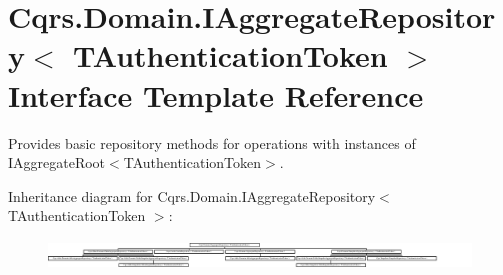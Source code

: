 \hypertarget{interfaceCqrs_1_1Domain_1_1IAggregateRepository}{}\section{Cqrs.\+Domain.\+I\+Aggregate\+Repository$<$ T\+Authentication\+Token $>$ Interface Template Reference}
\label{interfaceCqrs_1_1Domain_1_1IAggregateRepository}


Provides basic repository methods for operations with instances of I\+Aggregate\+Root$<$\+T\+Authentication\+Token$>$.  


Inheritance diagram for Cqrs.\+Domain.\+I\+Aggregate\+Repository$<$ T\+Authentication\+Token $>$\+:\begin{figure}[H]
\begin{center}
\leavevmode
\includegraphics[height=0.785965cm]{interfaceCqrs_1_1Domain_1_1IAggregateRepository}
\end{center}
\end{figure}
